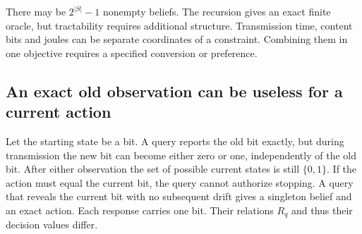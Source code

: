 There may be $2^{|S|}-1$ nonempty beliefs. The recursion gives an exact finite oracle, but tractability requires additional structure. Transmission time, content bits and joules can be separate coordinates of a constraint. Combining them in one objective requires a specified conversion or preference.

\subsection{An exact old observation can be useless for a current action}
Let the starting state be a bit. A query reports the old bit exactly, but during transmission the new bit can become either zero or one, independently of the old bit. After either observation the set of possible current states is still $\{0,1\}$. If the action must equal the current bit, the query cannot authorize stopping. A query that reveals the current bit with no subsequent drift gives a singleton belief and an exact action. Each response carries one bit. Their relations $R_q$ and thus their decision values differ.
